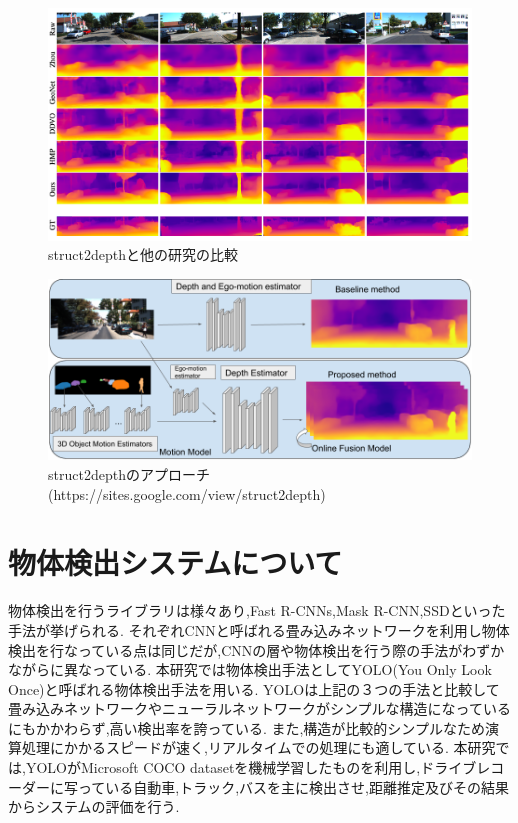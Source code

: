 \begin{figure}[hp]
  \begin{center}
   \includegraphics[width=\textwidth]{figs/struct2depth_related.png}
  \end{center}
  \caption{struct2depthと他の研究の比較\cite{casser2019struct2depth}}
  \label{fig:depth_related}
\end{figure}

\begin{figure}[hp]
  \begin{center}
   \includegraphics[width=\textwidth]{figs/aproach_depth.png}
  \end{center}
  \caption{struct2depthのアプローチ(https://sites.google.com/view/struct2depth)}
  \label{fig:approach_depth}
\end{figure}

\newpage
\section{物体検出システムについて}
物体検出を行うライブラリは様々あり,Fast R-CNNs\cite{ren2015faster},Mask R-CNN\cite{he2017mask},SSD\cite{liu2016ssd}といった手法が挙げられる.
それぞれCNNと呼ばれる畳み込みネットワークを利用し物体検出を行なっている点は同じだが,CNNの層や物体検出を行う際の手法がわずかながらに異なっている.
本研究では物体検出手法としてYOLO(You Only Look Once)\cite{yolov3}と呼ばれる物体検出手法を用いる.
YOLOは上記の３つの手法と比較して畳み込みネットワークやニューラルネットワークがシンプルな構造になっているにもかかわらず,高い検出率を誇っている.
また,構造が比較的シンプルなため演算処理にかかるスピードが速く,リアルタイムでの処理にも適している.
本研究では,YOLOがMicrosoft COCO datasetを機械学習したものを利用し,ドライブレコーダーに写っている自動車,トラック,バスを主に検出させ,距離推定及びその結果からシステムの評価を行う.

